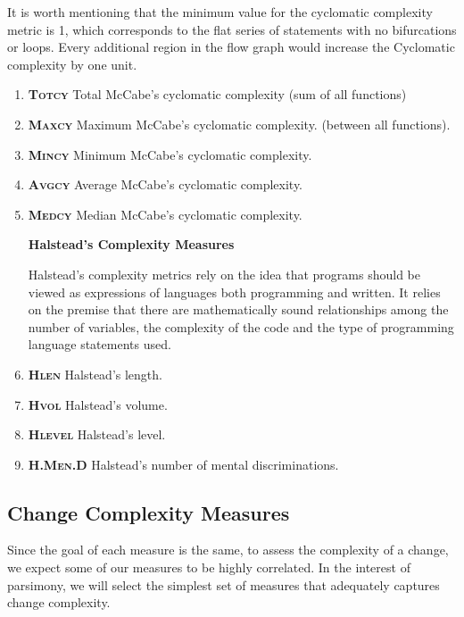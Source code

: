 \documentclass[9pt,twocolumn,a4paper]{article}
\begin{document}
It is worth mentioning that the minimum value for the cyclomatic complexity metric is 1, which corresponds to the flat series of statements with no bifurcations or loops. Every additional region in the flow graph would increase the Cyclomatic complexity by one unit.
\begin{enumerate}
\item{\bf{\textsc{Totcy}}} Total McCabe's cyclomatic complexity (sum of all functions)
\item{\bf{\textsc{Maxcy}}} Maximum McCabe's cyclomatic complexity. (between all functions).

\item{\bf{\textsc{Mincy}}} Minimum McCabe's cyclomatic complexity.
\item{\bf{\textsc{Avgcy}}} Average McCabe's cyclomatic complexity.
\item{\bf{\textsc{Medcy}}} Median McCabe's cyclomatic complexity.

{\bf{Halstead's Complexity Measures}}

Halstead's complexity metrics rely on the idea that programs should be viewed as expressions of languages both programming and written. It relies on the premise that there are mathematically sound relationships among the number of variables, the complexity of the code and the type of programming language statements used.

\item{\bf{\textsc{Hlen}}} Halstead's length.
\item{\bf{\textsc{Hvol}}} Halstead's volume.

\item{\bf{\textsc{Hlevel}}} Halstead's level.

\item{\bf{\textsc{H.Men.D}}} Halstead's number of mental discriminations.



\end{enumerate}

\subsection{Change Complexity Measures}

Since the goal of each measure is the same, to assess the complexity of a change, we expect some of our measures to be highly correlated. In the interest of parsimony, we will select the simplest set of measures that adequately captures change complexity.
\end{document}
